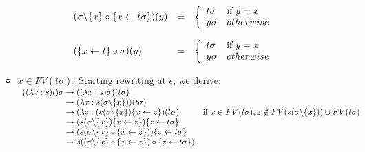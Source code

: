 \documentclass[a4paper]{article}
\theoremstyle{definition}
\begin{document}
\begin{itemize}
\begin{itemize}
    \[
      \begin{array}{lcl}
        (\sigma\backslash\{x\} \circ \{x \leftarrow t\sigma\})(y)
        & = &
              \left\{
              \begin{array}{ll}
                t\sigma&\mbox{if }y=x\\
                y\sigma& otherwise\\
              \end{array}
        \right.
        \\\\
        (\{x \leftarrow t\} \circ \sigma) (y) &=&
                                                         \left\{
                                                         \begin{array}{ll}
                                                           t \sigma&\mbox{if }y=x\\
                                                           y \sigma & otherwise\\
                                                         \end{array}
        \right.\\
      \end{array}
    \]

  \item $x \in FV(t\sigma)$: Starting rewriting at $\epsilon$, we derive:\\
    $
    \begin{array}{r@{\rewrites}ll}
      ((\lambda x:s)t)\sigma & ((\lambda x:s)\sigma)(t\sigma) & \\
                             & (\lambda x : s(\sigma\fpwithoutset{x}))
                               (t\sigma) & \\
                             &  (\lambda z : (s(\sigma\fpwithoutset{x})
                               \fpsubstin{x \fpwith z} )(t\sigma)
                                                              & \mbox{if }x \in FV(t\sigma),
                                                                z \not \in FV(s(\sigma\fpwithoutset{x}))  \cup FV(t\sigma)\\
                             & (s(\sigma\fpwithoutset{x})
                               \fpsubstin{x \fpwith z} )\fpsubstin{z
                               \fpwith t\sigma} \\
                             & (s(\sigma\fpwithoutset{x} \fpscat
                               \fpsubstin{x \fpwith z} ))\fpsubstin{z
                               \fpwith t\sigma} \\
                             & s((\sigma\fpwithoutset{x} \fpscat
                               \fpsubstin{x \fpwith z}) \fpscat
                               \fpsubstin{z \fpwith t\sigma} ) \\
    \end{array}
    $


\end{itemize}
\end{itemize}
\end{document}
